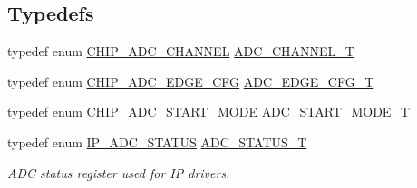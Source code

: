 \subsection*{Typedefs}
\begin{DoxyCompactItemize}
\item 
typedef enum \hyperlink{group__ADC__17XX__40XX_ga67b0a9ec8f34cf712b1f1c0119ba3d50}{C\+H\+I\+P\+\_\+\+A\+D\+C\+\_\+\+C\+H\+A\+N\+N\+EL} \hyperlink{group__ADC__17XX__40XX_ga30ee7058bc7cc1daff718b29b42bed4e}{A\+D\+C\+\_\+\+C\+H\+A\+N\+N\+E\+L\+\_\+T}
\item 
typedef enum \hyperlink{group__ADC__17XX__40XX_gaba28e4e0734cc41087bae0c96d5090a8}{C\+H\+I\+P\+\_\+\+A\+D\+C\+\_\+\+E\+D\+G\+E\+\_\+\+C\+FG} \hyperlink{group__ADC__17XX__40XX_ga18d12879b004e16af3b47467a2d81d56}{A\+D\+C\+\_\+\+E\+D\+G\+E\+\_\+\+C\+F\+G\+\_\+T}
\item 
typedef enum \hyperlink{group__ADC__17XX__40XX_ga125e3c848732e5fa6e064354f618f57c}{C\+H\+I\+P\+\_\+\+A\+D\+C\+\_\+\+S\+T\+A\+R\+T\+\_\+\+M\+O\+DE} \hyperlink{group__ADC__17XX__40XX_ga68aae5a89b4dabc910e457a00e57ea8c}{A\+D\+C\+\_\+\+S\+T\+A\+R\+T\+\_\+\+M\+O\+D\+E\+\_\+T}
\item 
typedef enum \hyperlink{group__ADC__17XX__40XX_ga4cdc8cd4b1ae4721ff5de44c783f310a}{I\+P\+\_\+\+A\+D\+C\+\_\+\+S\+T\+A\+T\+US} \hyperlink{group__ADC__17XX__40XX_ga5e2ef3f894759bbb12a9abf68518cbb7}{A\+D\+C\+\_\+\+S\+T\+A\+T\+U\+S\+\_\+T}
\begin{DoxyCompactList}\small\item\em A\+DC status register used for IP drivers. \end{DoxyCompactList}\end{DoxyCompactItemize}
